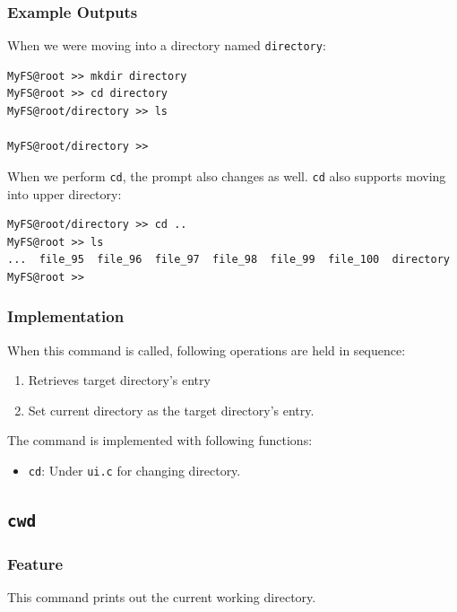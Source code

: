 \documentclass{homework}
\begin{document}
\subsubsection{Example Outputs}
When we were moving into a directory named \texttt{directory}:
\\
\begin{center}
\begin{code}
\begin{verbatim}
MyFS@root >> mkdir directory
MyFS@root >> cd directory
MyFS@root/directory >> ls

MyFS@root/directory >>
\end{verbatim}
\end{code}
\end{center}
When we perform \texttt{cd}, the prompt also changes as well. \texttt{cd} also supports moving into upper directory:
\\
\begin{center}
\begin{code}
\begin{verbatim}
MyFS@root/directory >> cd ..
MyFS@root >> ls
...  file_95  file_96  file_97  file_98  file_99  file_100  directory
MyFS@root >>
\end{verbatim}
\end{code}
\end{center}

\subsubsection{Implementation}
When this command is called, following operations are held in sequence:
\begin{enumerate}
    \item Retrieves target directory's entry
    \item Set current directory as the target directory's entry.
\end{enumerate}

The command is implemented with following functions:
\begin{itemize}
    \item \texttt{cd}: Under \texttt{ui.c} for changing directory.
\end{itemize}

\pagebreak
\subsection{\texttt{cwd}}
\subsubsection{Feature}
This command prints out the current working directory.
\end{document}
